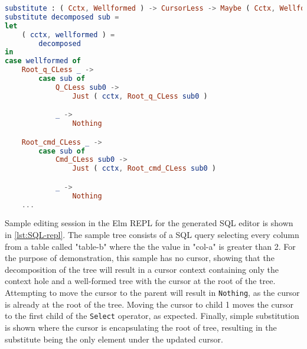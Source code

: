 \begin{minipage}{\textwidth}
    \begin{lstlisting}[style=inline, language=elm, caption={Generated functions for cursor substitution for the SQL language}, label={lst:SQL-sub}]
substitute : ( Cctx, Wellformed ) -> CursorLess -> Maybe ( Cctx, Wellformed )
substitute decomposed sub =
let
    ( cctx, wellformed ) =
        decomposed
in
case wellformed of
    Root_q_CLess _ ->
        case sub of
            Q_CLess sub0 ->
                Just ( cctx, Root_q_CLess sub0 )

            _ ->
                Nothing

    Root_cmd_CLess _ ->
        case sub of
            Cmd_CLess sub0 ->
                Just ( cctx, Root_cmd_CLess sub0 )

            _ ->
                Nothing
    ...
\end{lstlisting}
\end{minipage}

Sample editing session in the Elm REPL for the generated SQL editor is
shown in \cref{lst:SQL-repl}. The sample tree consists of a SQL query
selecting every column from a table called "table-b" where the the value in
"col-a" is greater than 2. For the purpose of demonstration, this sample
has no cursor, showing that the decomposition of the tree will result in a
cursor context containing only the context hole and a well-formed tree
with the cursor at the root of the tree. Attempting to move the cursor to the
parent will result in \texttt{Nothing}, as the cursor is already at the root
of the tree. Moving the cursor to child 1 moves the cursor to the first child
of the \texttt{Select} operator, as expected. Finally, simple substitution
is shown where the cursor is encapsulating the root of tree, resulting
in the substitute being the only element under the updated cursor.

